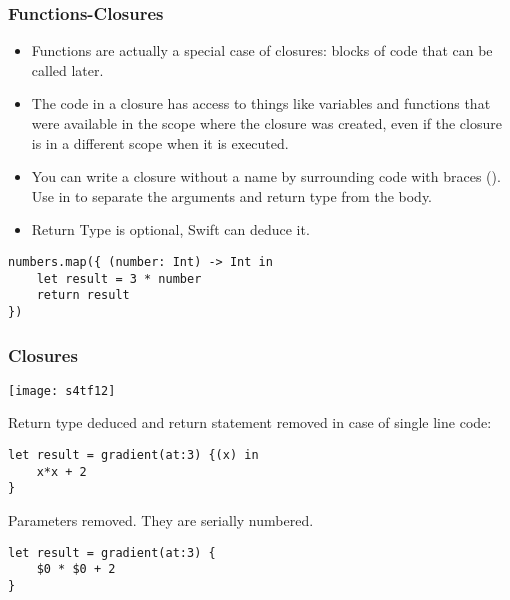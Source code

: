 \begin{frame}[fragile] \frametitle{Functions-Closures}
\begin{itemize}
\item Functions are actually a special case of closures: blocks of code that can be called later. 
\item The code in a closure has access to things like variables and functions that were available in the scope where the closure was created, even if the closure is in a different scope when it is executed.
\item You can write a closure without a name by surrounding code with braces ({}). Use in to separate the arguments and return type from the body.
\item Return Type is optional, Swift can deduce it.
\end{itemize}

\begin{lstlisting}[basicstyle=\scriptsize]
numbers.map({ (number: Int) -> Int in
    let result = 3 * number
    return result
})
\end{lstlisting}


\end{frame}

\begin{frame}[fragile] \frametitle{Closures}
\begin{center}
\texttt{[image: s4tf12]}
\end{center}

Return type deduced and return statement removed in case of single line code:
\begin{lstlisting}[basicstyle=\scriptsize]
let result = gradient(at:3) {(x) in 
	x*x + 2
}
\end{lstlisting}

Parameters removed. They are serially numbered.
\begin{lstlisting}[basicstyle=\scriptsize]
let result = gradient(at:3) {
	$0 * $0 + 2
}
\end{lstlisting}



\end{frame}



